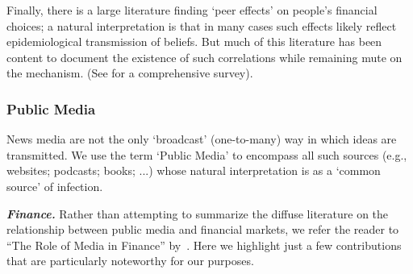
Finally, there is a large literature finding `peer effects' on people's financial choices; a natural interpretation is that in many cases such effects likely reflect epidemiological transmission of beliefs.  But much of this literature has been content to document the existence of such correlations while remaining mute on the mechanism.  (See \cite{kuchler2021social} for a comprehensive survey).



\hypertarget{publicmedia}{}
\subsubsection{Public Media}

News media are not the only `broadcast' (one-to-many) way in which ideas are transmitted.  We use the term `Public Media' to encompass all such sources (e.g., websites;  podcasts;  books; ...) whose natural interpretation is as a `common source' of infection.

\textbf{\textit{Finance.}}  Rather than attempting to summarize the diffuse literature on the relationship between public media and financial markets, we refer the reader to ``The Role of Media in Finance'' by~\cite{TETLOCK2015701}.  Here we highlight just a few contributions that are particularly noteworthy for our purposes. %

